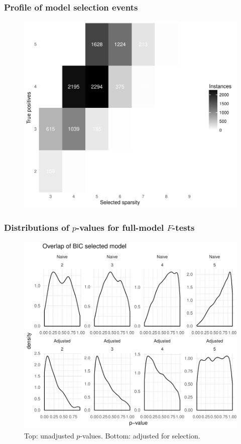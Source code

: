 \documentclass{beamer}
\begin{document}
\begin{frame}
  \frametitle{Profile of model selection events}
  \centering
  \begin{figure}
  \includegraphics[scale=0.45]{fstepbic2.pdf}
  \end{figure}
\end{frame}



\begin{frame}
  \frametitle{Distributions of $p$-values for full-model $F$-tests}
  \centering
  \begin{figure}
  \includegraphics[scale=0.5]{fdists_both2}
  \caption{Top: unadjusted $p$-values. Bottom: adjusted for selection.}
  \end{figure}
\end{frame}
\end{document}
